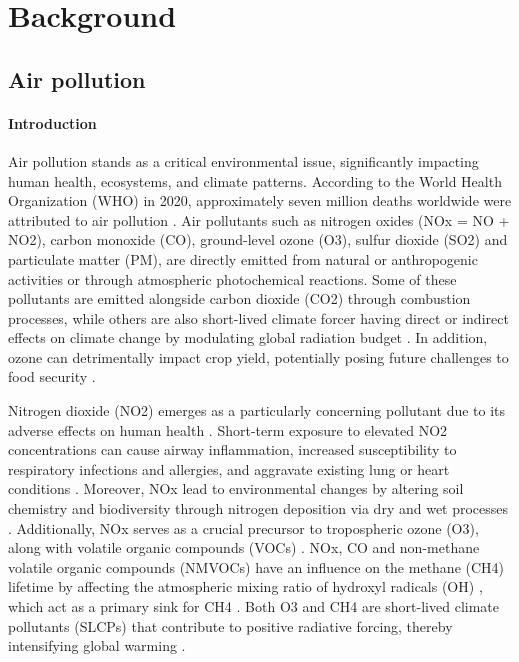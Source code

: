 \chapter{Background}
\renewcommand{\headrulewidth}{0pt}
\lhead[\thepage]{\leftmark}
\rhead[\leftmark]{\thepage}
\cfoot[]{}

\section{Air pollution}
\subsubsection{Introduction}

Air pollution stands as a critical environmental issue, significantly impacting human health, ecosystems, and climate patterns. According to the World Health Organization (WHO) in 2020, approximately seven million deaths worldwide were attributed to air pollution \citep{who2020world}. Air pollutants such as nitrogen oxides (NOx = NO + NO2), carbon monoxide (CO), ground-level ozone (O3), sulfur dioxide (SO2) and particulate matter (PM), are directly emitted from natural or anthropogenic activities or through atmospheric photochemical reactions. Some of these pollutants are emitted alongside carbon dioxide (CO2) through combustion processes, while others are also short-lived climate forcer having direct or indirect effects on climate change by modulating global radiation budget \citep{RN3}. In addition, ozone can detrimentally impact crop yield, potentially posing future challenges to food security \citep{avnery2011global, avnery2011global2, chuwah2015global, tai2017impacts}.\par
Nitrogen dioxide (NO2) emerges as a particularly concerning pollutant due to its adverse effects on human health \citep{hamra2015lung}. Short-term exposure to elevated NO2 concentrations can cause airway inflammation, increased susceptibility to respiratory infections and allergies, and aggravate existing lung or heart conditions \citep{bono2016air, kelly2011air}. Moreover, NOx lead to environmental changes by altering soil chemistry and biodiversity through nitrogen deposition via dry and wet processes \citep{bobbink2010global}. Additionally, NOx serves as a crucial precursor to tropospheric ozone (O3), along with volatile organic compounds (VOCs) \citep{akimoto2022rethinking}. NOx, CO and non-methane volatile organic compounds (NMVOCs) have an influence on the methane (CH4) lifetime by affecting the atmospheric mixing ratio of hydroxyl radicals (OH) \citep{akimoto2022rethinking}, which act as a primary sink for CH4 \citep{turner2019interpreting}. Both O3 and CH4 are short-lived climate pollutants (SLCPs) that contribute to positive radiative forcing, thereby intensifying global warming \citep{akimoto2022rethinking}. 
